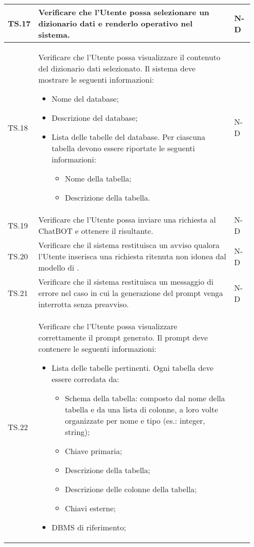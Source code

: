 \begin{adjustwidth}{-0.5cm}{-0.5cm}
\begin{longtable}{|P{1.5cm}|>{\raggedright}P{9.5cm}|>{\arraybackslash}P{1.5cm}|}
		\hline TS.17 & Verificare che l'Utente possa selezionare un dizionario dati e renderlo operativo nel sistema. & N-D \\ 
		\hline TS.18 & Verificare che l'Utente possa visualizzare il contenuto del dizionario dati selezionato. Il sistema deve mostrare le seguenti informazioni:
		\begin{itemize}
			\item Nome del database;
			\item Descrizione del database;
			\item Lista delle tabelle del database. Per ciascuna tabella devono essere riportate le seguenti informazioni:
				\begin{itemize}
					\item Nome della tabella;
					\item Descrizione della tabella.
				\end{itemize}
		\end{itemize} & N-D \\  
		\hline TS.19 & Verificare che l'Utente possa inviare una richiesta al ChatBOT e ottenere il  risultante. & N-D \\ 
		\hline TS.20 & Verificare che il sistema restituisca un avviso qualora l'Utente inserisca una richiesta ritenuta non idonea dal modello di . & N-D \\
		\hline TS.21 & Verificare che il sistema restituisca un messaggio di errore nel caso in cui la generazione del prompt venga interrotta senza preavviso. & N-D \\ 
		\hline TS.22 & Verificare che l'Utente possa visualizzare correttamente il prompt generato. Il prompt deve contenere le seguenti informazioni:
		\begin{itemize}
			\item Lista delle tabelle pertinenti. Ogni tabella deve essere corredata da:
			\begin{itemize}
				\item Schema della tabella: composto dal nome della tabella e da una lista di colonne, a loro volte organizzate per nome e tipo (es.: integer, string);
				\item Chiave primaria;
				\item Descrizione della tabella;
				\item Descrizione delle colonne della tabella;
				\item Chiavi esterne;
			\end{itemize}
			\item DBMS di riferimento;

\end{itemize}
\end{longtable}
\end{adjustwidth}

